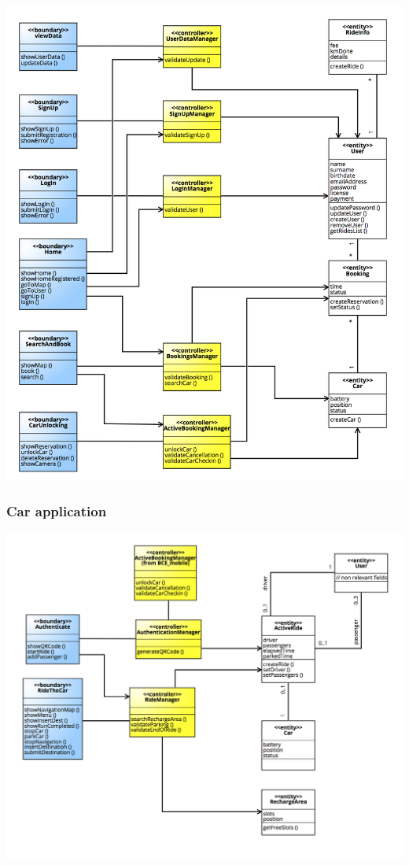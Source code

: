 \documentclass[]{article}
\begin{document}
\centerline{\includegraphics{./images/BCE_Mobile.png}}

\subsubsection{Car application}\label{car-application-1}

\centerline{\includegraphics{./images/BCE_Car.png}}
\end{document}
